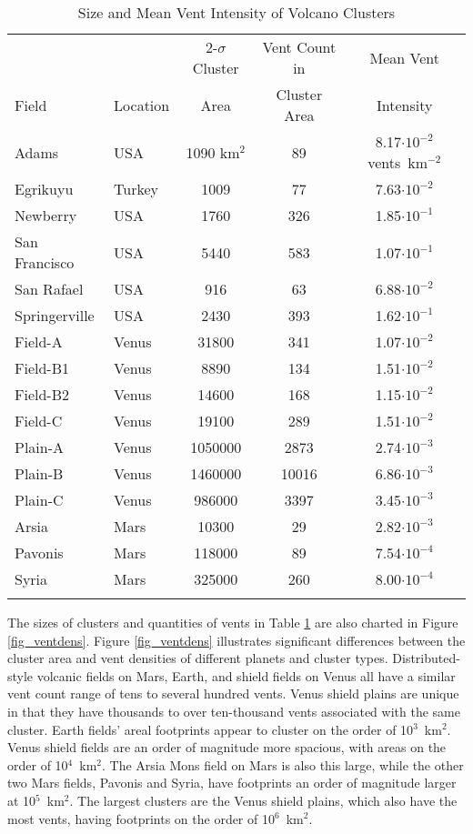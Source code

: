 \begin{table}
\centering
\caption{Size and Mean Vent Intensity of Volcano Clusters}
\begin{tabular}{l l c c c}
\toprule
& & 2-$\sigma$ Cluster & Vent Count in	&	Mean Vent\\
Field	&	Location & Area & Cluster Area	&	Intensity\\
\midrule
Adams	&	USA	&	1090	km$^2$	&	89 &	8.17$\cdot10^{-2}$ vents~km$^{-2}$	\\
Egrikuyu	&	Turkey	&	1009 &	77	&	7.63$\cdot10^{-2}$	\\
Newberry	&	USA	&	1760	&	326	&	1.85$\cdot10^{-1}$	\\
San Francisco	&	USA	&	5440	&	583	&	1.07$\cdot10^{-1}$	\\
San Rafael	&	USA	&	916	&	63	&	6.88$\cdot10^{-2}$	\\
Springerville	&	USA	&	2430	&	393	&	1.62$\cdot10^{-1}$	\\
Field-A	&	Venus	&	31800	&	341	&	1.07$\cdot10^{-2}$	\\
Field-B1	&	Venus	&	8890	&	134	&	1.51$\cdot10^{-2}$	\\
Field-B2	&	Venus	&	14600	&	168	&	1.15$\cdot10^{-2}$	\\
Field-C	&	Venus	&	19100	&	289	&	1.51$\cdot10^{-2}$	\\
Plain-A	&	Venus	&	1050000	&	2873	&	2.74$\cdot10^{-3}$	\\
Plain-B	&	Venus	&	1460000	&	10016	&	6.86$\cdot10^{-3}$	\\
Plain-C	&	Venus	&	986000	&	3397	&	3.45$\cdot10^{-3}$	\\
Arsia	&	Mars	&	10300	&	29	&	2.82$\cdot10^{-3}$	\\
Pavonis	&	Mars	&	118000	&	89	&	7.54$\cdot10^{-4}$	\\
Syria	&	Mars	&	325000	&	260	&	8.00$\cdot10^{-4}$	\\
\bottomrule
\label{tab_results}
\end{tabular}
\end{table}

The sizes of clusters and quantities of vents in Table \ref{tab_results} are also charted in Figure \ref{fig_ventdens}. Figure \ref{fig_ventdens} illustrates significant differences between the cluster area and vent densities of different planets and cluster types. Distributed-style volcanic fields on Mars, Earth, and shield fields on Venus all have a similar vent count range of tens to several hundred vents. Venus shield plains are unique in that they have thousands to over ten-thousand vents associated with the same cluster. Earth fields' areal footprints appear to cluster on the order of 10$^3$~km$^2$. Venus shield fields are an order of magnitude more spacious, with areas on the order of 10$^4$~km$^2$. The Arsia Mons field on Mars is also this large, while the other two Mars fields, Pavonis and Syria, have footprints an order of magnitude larger at 10$^5$~km$^2$. The largest clusters are the Venus shield plains, which also have the most vents, having footprints on the order of 10$^6$~km$^2$.

